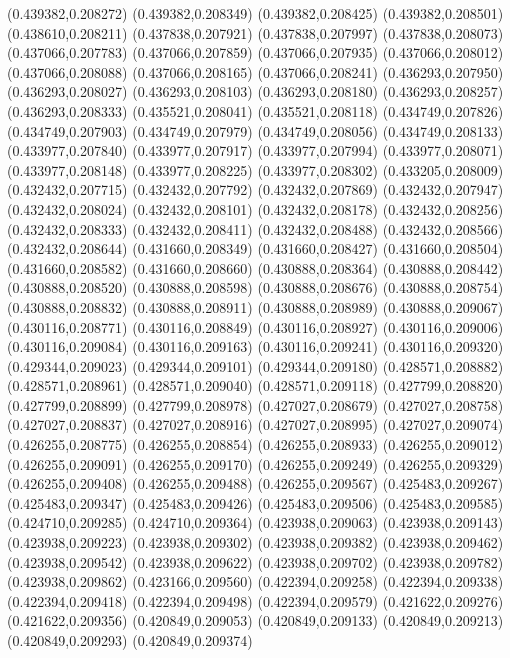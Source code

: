 (0.439382,0.208272)
(0.439382,0.208349)
(0.439382,0.208425)
(0.439382,0.208501)
(0.438610,0.208211)
(0.437838,0.207921)
(0.437838,0.207997)
(0.437838,0.208073)
(0.437066,0.207783)
(0.437066,0.207859)
(0.437066,0.207935)
(0.437066,0.208012)
(0.437066,0.208088)
(0.437066,0.208165)
(0.437066,0.208241)
(0.436293,0.207950)
(0.436293,0.208027)
(0.436293,0.208103)
(0.436293,0.208180)
(0.436293,0.208257)
(0.436293,0.208333)
(0.435521,0.208041)
(0.435521,0.208118)
(0.434749,0.207826)
(0.434749,0.207903)
(0.434749,0.207979)
(0.434749,0.208056)
(0.434749,0.208133)
(0.433977,0.207840)
(0.433977,0.207917)
(0.433977,0.207994)
(0.433977,0.208071)
(0.433977,0.208148)
(0.433977,0.208225)
(0.433977,0.208302)
(0.433205,0.208009)
(0.432432,0.207715)
(0.432432,0.207792)
(0.432432,0.207869)
(0.432432,0.207947)
(0.432432,0.208024)
(0.432432,0.208101)
(0.432432,0.208178)
(0.432432,0.208256)
(0.432432,0.208333)
(0.432432,0.208411)
(0.432432,0.208488)
(0.432432,0.208566)
(0.432432,0.208644)
(0.431660,0.208349)
(0.431660,0.208427)
(0.431660,0.208504)
(0.431660,0.208582)
(0.431660,0.208660)
(0.430888,0.208364)
(0.430888,0.208442)
(0.430888,0.208520)
(0.430888,0.208598)
(0.430888,0.208676)
(0.430888,0.208754)
(0.430888,0.208832)
(0.430888,0.208911)
(0.430888,0.208989)
(0.430888,0.209067)
(0.430116,0.208771)
(0.430116,0.208849)
(0.430116,0.208927)
(0.430116,0.209006)
(0.430116,0.209084)
(0.430116,0.209163)
(0.430116,0.209241)
(0.430116,0.209320)
(0.429344,0.209023)
(0.429344,0.209101)
(0.429344,0.209180)
(0.428571,0.208882)
(0.428571,0.208961)
(0.428571,0.209040)
(0.428571,0.209118)
(0.427799,0.208820)
(0.427799,0.208899)
(0.427799,0.208978)
(0.427027,0.208679)
(0.427027,0.208758)
(0.427027,0.208837)
(0.427027,0.208916)
(0.427027,0.208995)
(0.427027,0.209074)
(0.426255,0.208775)
(0.426255,0.208854)
(0.426255,0.208933)
(0.426255,0.209012)
(0.426255,0.209091)
(0.426255,0.209170)
(0.426255,0.209249)
(0.426255,0.209329)
(0.426255,0.209408)
(0.426255,0.209488)
(0.426255,0.209567)
(0.425483,0.209267)
(0.425483,0.209347)
(0.425483,0.209426)
(0.425483,0.209506)
(0.425483,0.209585)
(0.424710,0.209285)
(0.424710,0.209364)
(0.423938,0.209063)
(0.423938,0.209143)
(0.423938,0.209223)
(0.423938,0.209302)
(0.423938,0.209382)
(0.423938,0.209462)
(0.423938,0.209542)
(0.423938,0.209622)
(0.423938,0.209702)
(0.423938,0.209782)
(0.423938,0.209862)
(0.423166,0.209560)
(0.422394,0.209258)
(0.422394,0.209338)
(0.422394,0.209418)
(0.422394,0.209498)
(0.422394,0.209579)
(0.421622,0.209276)
(0.421622,0.209356)
(0.420849,0.209053)
(0.420849,0.209133)
(0.420849,0.209213)
(0.420849,0.209293)
(0.420849,0.209374)
